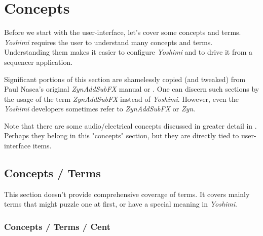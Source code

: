 %
%
%

\section{Concepts}
\label{sec:concepts}

   Before we start with the user-interface, let's cover some concepts and terms.
   \textsl{Yoshimi} requires the user to understand many concepts and terms.
   Understanding them makes it easier to configure \textsl{Yoshimi}
   and to drive it from a sequencer application.
   
   Significant portions of this section are shamelessly copied (and tweaked)
   from Paul Nasca's original \textsl{ZynAddSubFX}
   manual \cite{zynodt} or \cite{zynpdf}.
   One can discern such sections by the usage of the term
   \textsl{ZynAddSubFX} instead of \textsl{Yoshimi}.
   However, even the \textsl{Yoshimi} developers sometimes
   refer to \textsl{ZynAddSubFX} or \textsl{Zyn}.

   Note that there are some audio/electrical concepts discussed in greater
   detail in .
   Perhaps they belong in this "concepts" section, but
   they are directly tied to user-interface items.

\subsection{Concepts / Terms}
\label{subsec:concepts_terms}

   This section doesn't provide comprehensive coverage of terms.  It
   covers mainly terms that might puzzle one at first, or have a
   special meaning in \textsl{Yoshimi}.

\subsubsection{Concepts / Terms / Cent}
\label{subsubsec:concepts_terms_cent}

